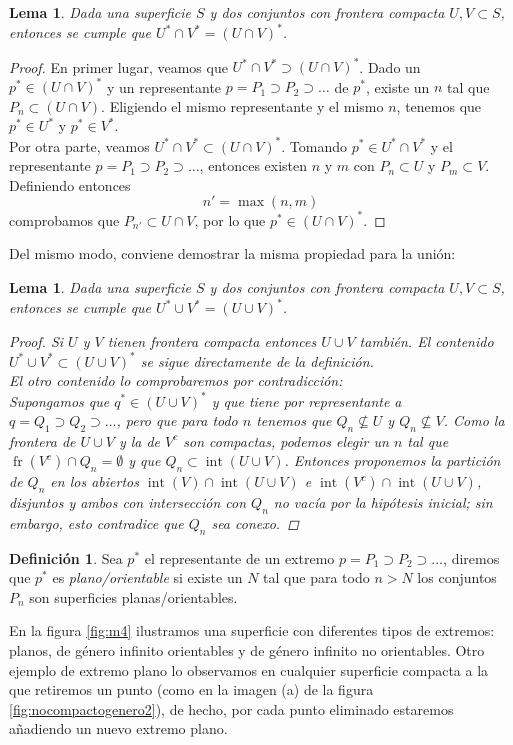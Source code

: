 \documentclass[a4paper,11pt,spanish, twoside, leqno]{tfg-uam}
\newtheorem{lema}[teor]{Lema}
\DeclareMathOperator{\interior}{int}
\DeclareMathOperator{\frontera}{fr}
\theoremstyle{definition}
\newtheorem{defin}[teor]{Definici\'on}
\begin{document}
\begin{lema}
\label{lema:intdeextremos}
Dada una superficie $S$ y dos conjuntos  con frontera compacta $U,V \subset S$, entonces se cumple que $U^*\cap V^* = (U \cap V)^* $.
\end{lema}
\begin{proof}
En primer lugar, veamos que $U^*\cap V^* \supset (U \cap V)^* $. Dado un $p^* \in (U \cap V)^*$ y un representante $p = P_1 \supset P_2 \supset \ldots$ de $p^*$, existe un $n$ tal que $P_n \subset (U \cap V)$. Eligiendo el mismo representante y el mismo $n$, tenemos que  $p^* \in U^*$ y $p^* \in V^*$. \\
Por otra parte, veamos $U^*\cap V^* \subset (U \cap V)^* $. Tomando $p^* \in U^* \cap V^*$ y el representante $p = P_1 \supset P_2 \supset \ldots$, entonces existen $n$ y $m$ con $P_n \subset U$ y $P_m \subset V$. Definiendo entonces
 \[ n' = \max(n,m)\]
  comprobamos que $P_{n'} \subset U \cap V$, por lo que $p^* \in (U \cap V)^*$.
\end{proof}

Del mismo modo, conviene demostrar la misma propiedad para la unión:
\begin{lema}
\label{lema:unideextremos}
Dada una superficie $S$ y dos conjuntos  con frontera compacta $U,V \subset S$, entonces se cumple que $U^*\cup V^* = (U \cup V)^* $.
\begin{proof}
Si $U$ y $V$ tienen frontera compacta entonces $U  \cup  V$ también. El contenido $U^*\cup V^* \subset (U \cup V)^* $ se sigue directamente de la definición.\\
El otro contenido lo comprobaremos por contradicción:\\
 Supongamos que $q^* \in (U \cup V)^*$ y que tiene por representante a $q = Q_1 \supset Q_2 \supset \ldots$, pero que para todo $n$ tenemos que $Q_n \nsubseteq U$ y $Q_n \nsubseteq V$. Como la frontera de $U \cup V$ y la de $V^c$ son compactas, podemos elegir un $n$ tal que $\frontera(V^c)\cap Q_n = \emptyset$ y que $Q_n \subset \interior(U\cup V)$. Entonces proponemos  la partición de $Q_n$ en los abiertos $\interior(V) \cap \interior(U \cup V)$ e  $\interior(V^c) \cap \interior(U \cup V)$, disjuntos y ambos con intersección con $Q_n$ no vacía por la hipótesis inicial; sin embargo, esto contradice que $Q_n$ sea conexo.
\end{proof}
\end{lema}

\begin{defin}
Sea $p^*$ el representante de un extremo $p =P_1 \supset P_2 \supset \ldots$, diremos que $p^*$ es \textit{plano/orientable} si existe un $N$ tal que para todo $n>N$ los conjuntos $P_n$ son superficies planas/orientables.
\end{defin}
En la figura \ref{fig:m4} ilustramos una superficie con diferentes tipos de extremos: planos, de género infinito orientables y de género infinito no orientables. Otro ejemplo de extremo plano lo observamos en cualquier superficie compacta a la que retiremos un punto (como en la imagen (a) de la figura \ref{fig:nocompactogenero2}), de hecho, por cada punto eliminado estaremos añadiendo un nuevo extremo plano.
\end{document}
